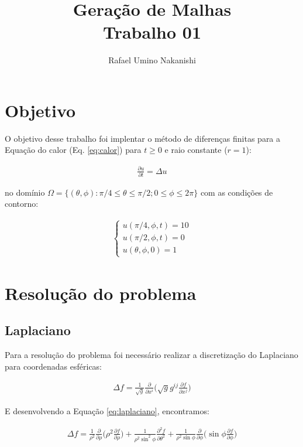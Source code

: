 \documentclass{article}
\title{Geração de Malhas\\{\large Trabalho 01}}
\author{Rafael Umino Nakanishi}
\date{}
\newcommand{\partials}[2]{
	\frac{\partial #1}{\partial #2}
}
\begin{document}
	\maketitle

	\section{Objetivo}
		O objetivo desse trabalho foi implentar o método de diferenças finitas para a Equação do calor (Eq. \ref{eq:calor}) para $t \geq 0$ e raio constante ($r=1$):

		\begin{eqnarray}
			\label{eq:calor}
			\frac{\partial u}{\partial t} = \Delta u
		\end{eqnarray}

		no domínio $\Omega = \{ (\theta,\phi): \pi/4 \leq \theta \leq \pi/2; 0 \leq \phi \leq 2\pi \}$ com as condições de contorno: 

		\begin{eqnarray*}
		\begin{cases}
			u(\pi/4, \phi, t) = 10\\
			u(\pi/2, \phi, t) = 0\\
			u(\theta, \phi, 0) = 1
		\end{cases}
		\end{eqnarray*}

	\section{Resolução do problema}
		\subsection{Laplaciano}
			Para a resolução do problema foi necessário realizar a discretização do Laplaciano para coordenadas esféricas:

			\begin{eqnarray}
				\label{eq:laplaciano}
				\Delta f = \frac{1}{\sqrt{g}} \frac{\partial}{\partial x^i} \bigg(\sqrt{g} g^{ij}\frac{\partial f}{\partial x^j}\bigg)
			\end{eqnarray}

			E desenvolvendo a Equação \ref{eq:laplaciano}, encontramos:

			\begin{eqnarray}
			 	\Delta f = \frac{1}{\rho^2} \partials{}{\rho}\bigg(\rho^2 \partials{f}{\rho}\bigg) + \frac{1}{\rho^2 \sin^2\phi}\partials{^2f}{\theta^2} + \frac{1}{\rho^2\sin\phi}\partials{}{\phi}\bigg(\sin\phi \partials{f}{\phi}\bigg)
			 \end{eqnarray} 
\end{document}
